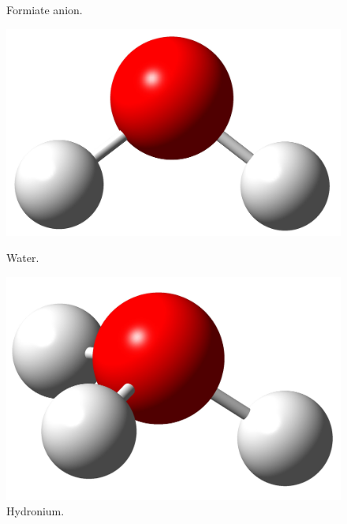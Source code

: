 \documentclass[twocolumn]{article}
\begin{document}
\begin{figure}[h!]
\begin{minipage}[b]{0.225\textwidth}
          \caption{Formiate anion.}
        \end{minipage}
        \centering
        \begin{minipage}[b]{0.225\textwidth}
            \centering
          \includegraphics[scale=0.04]{water.jpg}
          \caption{Water.}
        \end{minipage}
        \hfill
        \begin{minipage}[b]{0.225\textwidth}
          \centering
          \includegraphics[scale=0.05]{hidronio.jpg}
          \caption{Hydronium.}
        \end{minipage}
        \centering
        \begin{minipage}[b]{0.225\textwidth}
            \centering

\end{minipage}
\end{figure}
\end{document}
